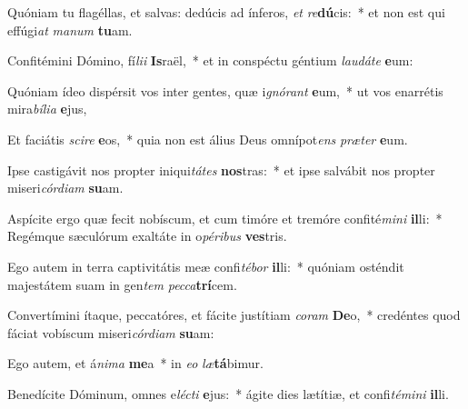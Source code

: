 \item Quóniam tu flagéllas, et salvas: dedúcis ad ínferos, \textit{et} \textit{re}\textbf{dú}cis:~* et non est qui effúgi\textit{at} \textit{ma}\textit{num} \textbf{tu}am.
\item Confitémini Dómino, fí\textit{li}\textit{i} \textbf{Is}raël,~* et in conspéctu géntium \textit{lau}\textit{dá}\textit{te} \textbf{e}um:
\item Quóniam ídeo dispérsit vos inter gentes, quæ i\textit{gnó}\textit{rant} \textbf{e}um,~* ut vos enarrétis mira\textit{bí}\textit{li}\textit{a} \textbf{e}jus,
\item Et faciátis \textit{sci}\textit{re} \textbf{e}os,~* quia non est álius Deus omnípot\textit{ens} \textit{præ}\textit{ter} \textbf{e}um.
\item Ipse castigávit nos propter iniqui\textit{tá}\textit{tes} \textbf{nos}tras:~* et ipse salvábit nos propter miseri\textit{cór}\textit{di}\textit{am} \textbf{su}am.
\item Aspícite ergo quæ fecit nobíscum, et cum timóre et tremóre confité\textit{mi}\textit{ni} \textbf{il}li:~* Regémque sæculórum exaltáte in o\textit{pé}\textit{ri}\textit{bus} \textbf{ves}tris.
\item Ego autem in terra captivitátis meæ confi\textit{té}\textit{bor} \textbf{il}li:~* quóniam osténdit majestátem suam in gen\textit{tem} \textit{pec}\textit{ca}\textbf{trí}cem.
\item Convertímini ítaque, peccatóres, et fácite justítiam \textit{co}\textit{ram} \textbf{De}o,~* credéntes quod fáciat vobíscum miseri\textit{cór}\textit{di}\textit{am} \textbf{su}am:
\item Ego autem, et á\textit{ni}\textit{ma} \textbf{me}a~* in \textit{e}\textit{o} \textit{læ}\textbf{tá}bimur.
\item Benedícite Dóminum, omnes e\textit{léc}\textit{ti} \textbf{e}jus:~* ágite dies lætítiæ, et confi\textit{té}\textit{mi}\textit{ni} \textbf{il}li.
